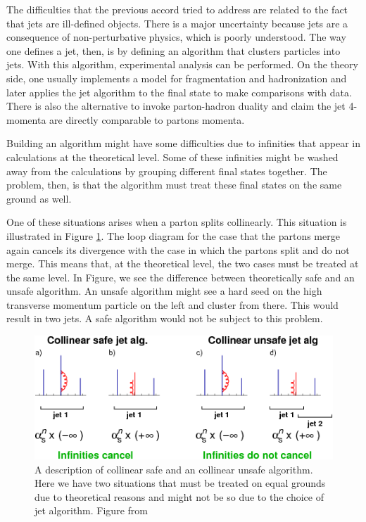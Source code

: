 The difficulties that the previous accord tried to address are related to the fact that jets are ill-defined objects. There is a major uncertainty because jets are a consequence of non-perturbative physics, which is poorly understood. The way one defines a jet, then, is by defining an algorithm that clusters particles into jets. With this algorithm, experimental analysis can be performed. On the theory side, one usually implements a model for fragmentation and hadronization and later applies the jet algorithm to the final state to make comparisons with data. There is also the alternative to invoke parton-hadron duality and claim the jet 4-momenta are directly comparable to partons momenta\cite{dissertori_quantum_2003}.
\par
Building an algorithm might have some difficulties due to infinities that appear in calculations at the theoretical level. Some of these infinities might be washed away from the calculations by grouping different final states together. The problem, then, is that the algorithm must treat these final states on the same ground as well.
\par
One of these situations arises when a parton splits collinearly. This situation is illustrated in Figure \ref{collinear_safe}. The loop diagram for the case that the partons merge again cancels its divergence with the case in which the partons split and do not merge. This means that, at the theoretical level, the two cases must be treated at the same level. In Figure, we see the difference between theoretically safe and an unsafe algorithm. An unsafe algorithm might see a hard seed on the high transverse momentum particle on the left and cluster from there. This would result in two jets. A safe algorithm would not be subject to this problem.

\begin{figure}
\includegraphics[width=1.0\textwidth]{images/collinear_safe.png}
\caption[Collinear safe ilustration]{A description of collinear safe and an collinear unsafe algorithm. Here we have two situations that must be treated on equal grounds due to theoretical reasons and might not be so due to the choice of jet algorithm. Figure from \cite{salam_towards_2010}}
\label{collinear_safe}
\end{figure}

